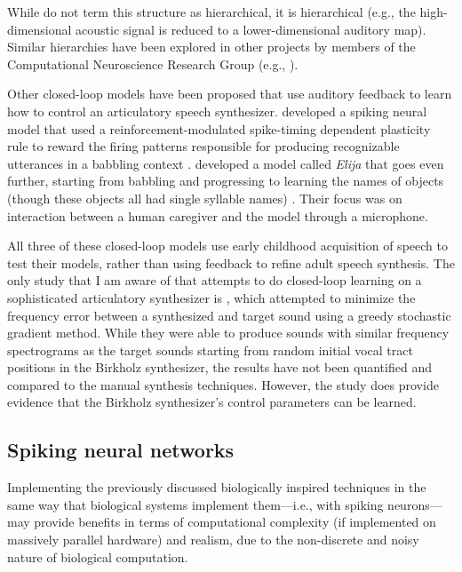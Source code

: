 \documentclass{article}
\begin{document}
While \citeauthor{kroger2009}
do not term this structure
as hierarchical,
it is hierarchical
(e.g., the high-dimensional acoustic
signal is reduced to a lower-dimensional
auditory map).
Similar hierarchies have been explored
in other projects by members of the
Computational Neuroscience Research Group
(e.g., \citealp{eliasmith2012,dewolf2011,rasmussen-inpress}).

Other closed-loop models
have been proposed
that use auditory feedback
to learn how to control
an articulatory speech synthesizer.
\citeauthor{warlaumont2012}
developed a spiking neural model
that used a reinforcement-modulated
spike-timing dependent plasticity rule
to reward the firing patterns
responsible for producing
recognizable utterances
in a babbling context
\citep{warlaumont2012,warlaumont2013}.
\citeauthor{howardXXX} developed
a model called \textit{Elija}
that goes even further,
starting from babbling
and progressing to learning
the names of objects
(though these objects all had
single syllable names) \citep{XXX}.
Their focus was on interaction
between a human caregiver
and the model through a microphone.

All three of these closed-loop models
use early childhood acquisition of speech
to test their models,
rather than using feedback
to refine adult speech synthesis.
The only study that I am aware of
that attempts to do closed-loop learning
on a sophisticated articulatory synthesizer
is \citet{promonXXX}, which attempted
to minimize the frequency error
between a synthesized and target sound
using a greedy stochastic gradient method.
While they were able to produce
sounds with similar frequency spectrograms
as the target sounds starting from
random initial vocal tract positions
in the Birkholz synthesizer,
the results have not been quantified
and compared to the manual
synthesis techniques.
However, the study does provide
evidence that the Birkholz synthesizer's
control parameters can be learned.

\subsection{Spiking neural networks}
\label{subsec:spiking}

Implementing the previously discussed
biologically inspired techniques in the same way
that biological systems implement
them---i.e., with spiking neurons---may
provide benefits in terms of
computational complexity
(if implemented on massively parallel hardware)
and realism, due to the non-discrete
and noisy nature of biological computation.
\end{document}
